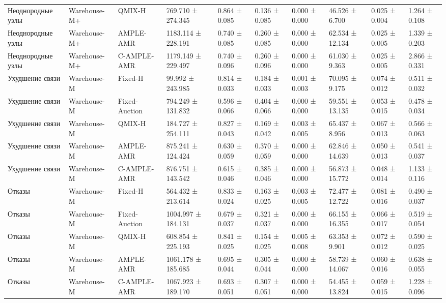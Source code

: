 \begin{tabular}{llllllllll}
 Неоднородные узлы & Warehouse-M+ & QMIX-H & 769.710 ± 274.345 & 0.864 ± 0.085 & 0.136 ± 0.085 & 0.000 ± 0.000 & 46.526 ± 6.700 & 0.025 ± 0.004 & 1.264 ± 0.108 \\
 Неоднородные узлы & Warehouse-M+ & AMPLE-AMR & 1183.114 ± 228.191 & 0.740 ± 0.085 & 0.260 ± 0.085 & 0.000 ± 0.000 & 62.534 ± 12.134 & 0.025 ± 0.005 & 1.339 ± 0.203 \\
 Неоднородные узлы & Warehouse-M+ & C-AMPLE-AMR & 1179.149 ± 229.497 & 0.740 ± 0.096 & 0.260 ± 0.096 & 0.000 ± 0.000 & 61.030 ± 9.363 & 0.025 ± 0.005 & 2.866 ± 0.331 \\
 Ухудшение связи & Warehouse-M & Fixed-H & 99.992 ± 243.985 & 0.814 ± 0.033 & 0.184 ± 0.033 & 0.001 ± 0.003 & 70.095 ± 9.175 & 0.074 ± 0.012 & 0.511 ± 0.032 \\
 Ухудшение связи & Warehouse-M & Fixed-Auction & 794.249 ± 131.832 & 0.596 ± 0.066 & 0.404 ± 0.066 & 0.000 ± 0.000 & 59.551 ± 13.135 & 0.053 ± 0.015 & 0.478 ± 0.034 \\
 Ухудшение связи & Warehouse-M & QMIX-H & 184.727 ± 254.111 & 0.827 ± 0.043 & 0.169 ± 0.042 & 0.003 ± 0.005 & 65.437 ± 8.956 & 0.067 ± 0.013 & 0.566 ± 0.063 \\
 Ухудшение связи & Warehouse-M & AMPLE-AMR & 875.241 ± 124.424 & 0.630 ± 0.059 & 0.370 ± 0.059 & 0.000 ± 0.000 & 62.846 ± 14.639 & 0.050 ± 0.013 & 0.541 ± 0.037 \\
 Ухудшение связи & Warehouse-M & C-AMPLE-AMR & 876.751 ± 143.542 & 0.615 ± 0.046 & 0.385 ± 0.046 & 0.000 ± 0.000 & 56.873 ± 15.772 & 0.048 ± 0.014 & 1.133 ± 0.116 \\
 Отказы & Warehouse-M & Fixed-H & 564.432 ± 213.614 & 0.833 ± 0.024 & 0.163 ± 0.025 & 0.003 ± 0.005 & 72.477 ± 12.722 & 0.081 ± 0.016 & 0.490 ± 0.037 \\
 Отказы & Warehouse-M & Fixed-Auction & 1004.997 ± 184.131 & 0.679 ± 0.037 & 0.321 ± 0.037 & 0.000 ± 0.000 & 66.155 ± 16.355 & 0.066 ± 0.017 & 0.519 ± 0.054 \\
 Отказы & Warehouse-M & QMIX-H & 608.854 ± 225.193 & 0.841 ± 0.025 & 0.154 ± 0.025 & 0.005 ± 0.008 & 63.353 ± 9.901 & 0.072 ± 0.012 & 0.590 ± 0.025 \\
 Отказы & Warehouse-M & AMPLE-AMR & 1061.178 ± 185.685 & 0.695 ± 0.044 & 0.305 ± 0.044 & 0.000 ± 0.000 & 58.739 ± 14.067 & 0.060 ± 0.016 & 0.638 ± 0.055 \\
 Отказы & Warehouse-M & C-AMPLE-AMR & 1067.923 ± 189.170 & 0.693 ± 0.051 & 0.307 ± 0.051 & 0.000 ± 0.000 & 54.455 ± 13.824 & 0.059 ± 0.015 & 1.228 ± 0.096 \\
\bottomrule
\end{tabular}

